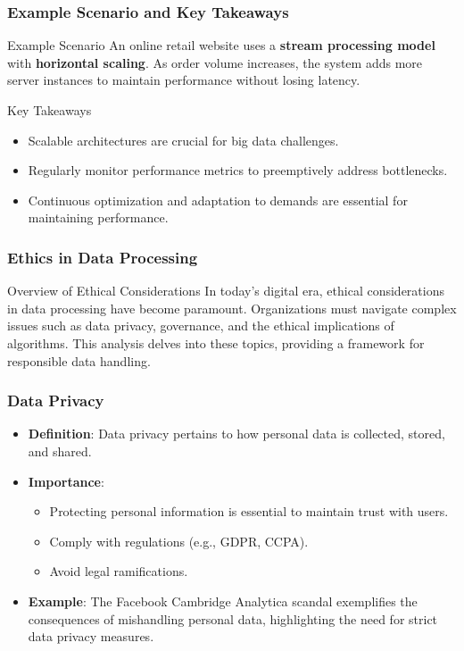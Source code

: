 \documentclass[aspectratio=169]{beamer}
\begin{document}
\begin{frame}[fragile]
    \frametitle{Example Scenario and Key Takeaways}
    \begin{block}{Example Scenario}
        An online retail website uses a \textbf{stream processing model} with \textbf{horizontal scaling}. As order volume increases, the system adds more server instances to maintain performance without losing latency.
    \end{block}

    \begin{block}{Key Takeaways}
        \begin{itemize}
            \item Scalable architectures are crucial for big data challenges.
            \item Regularly monitor performance metrics to preemptively address bottlenecks.
            \item Continuous optimization and adaptation to demands are essential for maintaining performance.
        \end{itemize}
    \end{block}
\end{frame}

\begin{frame}[fragile]
    \frametitle{Ethics in Data Processing}
    \begin{block}{Overview of Ethical Considerations}
        In today's digital era, ethical considerations in data processing have become paramount. Organizations must navigate complex issues such as data privacy, governance, and the ethical implications of algorithms. This analysis delves into these topics, providing a framework for responsible data handling.
    \end{block}
\end{frame}

\begin{frame}[fragile]
    \frametitle{Data Privacy}
    \begin{itemize}
        \item \textbf{Definition}: Data privacy pertains to how personal data is collected, stored, and shared.
        \item \textbf{Importance}: 
        \begin{itemize}
            \item Protecting personal information is essential to maintain trust with users.
            \item Comply with regulations (e.g., GDPR, CCPA).
            \item Avoid legal ramifications.
        \end{itemize}
        \item \textbf{Example}: The Facebook Cambridge Analytica scandal exemplifies the consequences of mishandling personal data, highlighting the need for strict data privacy measures.
    \end{itemize}
\end{frame}
\end{document}
